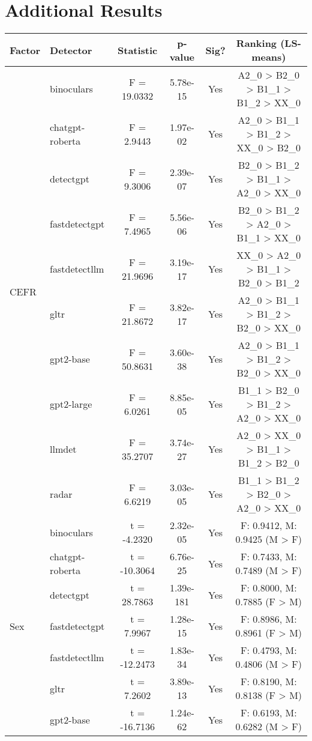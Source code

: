\section{Additional Results}

\begin{table*}[ht!]
\centering
\small
\begin{tabular}{llcccc}
\toprule
\textbf{Factor} & \textbf{Detector} & \textbf{Statistic} & \textbf{p-value} & \textbf{Sig?} & \textbf{Ranking (LS-means)} \\
\midrule
\multirow{10}{*}{CEFR} & binoculars & F = 19.0332 & 5.78e-15 & Yes & A2\_0 > B2\_0 > B1\_1 > B1\_2 > XX\_0 \\
 & chatgpt-roberta & F = 2.9443 & 1.97e-02 & Yes & A2\_0 > B1\_1 > B1\_2 > XX\_0 > B2\_0 \\
 & detectgpt & F = 9.3006 & 2.39e-07 & Yes & B2\_0 > B1\_2 > B1\_1 > A2\_0 > XX\_0 \\
 & fastdetectgpt & F = 7.4965 & 5.56e-06 & Yes & B2\_0 > B1\_2 > A2\_0 > B1\_1 > XX\_0 \\
 & fastdetectllm & F = 21.9696 & 3.19e-17 & Yes & XX\_0 > A2\_0 > B1\_1 > B2\_0 > B1\_2 \\
 & gltr & F = 21.8672 & 3.82e-17 & Yes & A2\_0 > B1\_1 > B1\_2 > B2\_0 > XX\_0 \\
 & gpt2-base & F = 50.8631 & 3.60e-38 & Yes & A2\_0 > B1\_1 > B1\_2 > B2\_0 > XX\_0 \\
 & gpt2-large & F = 6.0261 & 8.85e-05 & Yes & B1\_1 > B2\_0 > B1\_2 > A2\_0 > XX\_0 \\
 & llmdet & F = 35.2707 & 3.74e-27 & Yes & A2\_0 > XX\_0 > B1\_1 > B1\_2 > B2\_0 \\
 & radar & F = 6.6219 & 3.03e-05 & Yes & B1\_1 > B1\_2 > B2\_0 > A2\_0 > XX\_0 \\
\midrule
\multirow{10}{*}{Sex} & binoculars & t = -4.2320 & 2.32e-05 & Yes & F: 0.9412, M: 0.9425 (M > F) \\
 & chatgpt-roberta & t = -10.3064 & 6.76e-25 & Yes & F: 0.7433, M: 0.7489 (M > F) \\
 & detectgpt & t = 28.7863 & 1.39e-181 & Yes & F: 0.8000, M: 0.7885 (F > M) \\
 & fastdetectgpt & t = 7.9967 & 1.28e-15 & Yes & F: 0.8986, M: 0.8961 (F > M) \\
 & fastdetectllm & t = -12.2473 & 1.83e-34 & Yes & F: 0.4793, M: 0.4806 (M > F) \\
 & gltr & t = 7.2602 & 3.89e-13 & Yes & F: 0.8190, M: 0.8138 (F > M) \\
 & gpt2-base & t = -16.7136 & 1.24e-62 & Yes & F: 0.6193, M: 0.6282 (M > F) \\

\end{tabular}
\end{table*}
